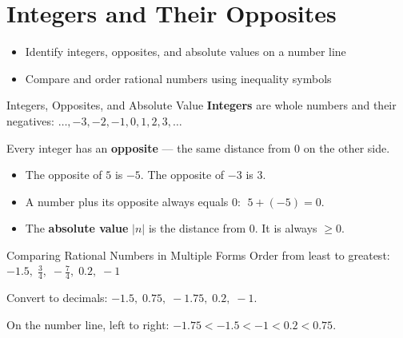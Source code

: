\section{Integers and Their Opposites}

\begin{learningGoals}
\begin{itemize}
    \item Identify integers, opposites, and absolute values on a number line
    \item Compare and order rational numbers using inequality symbols
\end{itemize}
\end{learningGoals}

\begin{conceptBox}{Integers, Opposites, and Absolute Value}
\textbf{Integers} are whole numbers and their negatives: $\ldots, -3, -2, -1, 0, 1, 2, 3, \ldots$

Every integer has an \textbf{opposite} — the same distance from $0$ on the other side.
\begin{itemize}[leftmargin=*]
    \item The opposite of $5$ is $-5$. The opposite of $-3$ is $3$.
    \item A number plus its opposite always equals $0$: $\;5 + (-5) = 0$.
    \item The \textbf{absolute value} $|n|$ is the distance from $0$. It is always $\geq 0$.
\end{itemize}
\end{conceptBox}


\begin{workedExample}{Comparing Rational Numbers in Multiple Forms}
Order from least to greatest: $-1.5, \;\frac{3}{4}, \;-\frac{7}{4}, \;0.2, \;-1$

Convert to decimals: $-1.5, \;0.75, \;-1.75, \;0.2, \;-1$.

On the number line, left to right: $-1.75 < -1.5 < -1 < 0.2 < 0.75$.

\end{workedExample}



